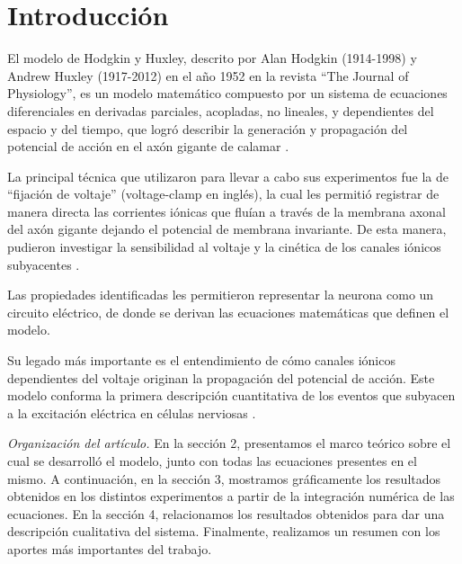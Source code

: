 \documentclass[aps,twocolumn,groupedaddress]{revtex4-2}
\begin{document}

\maketitle

\section{Introducción}
El modelo de Hodgkin y Huxley, descrito por Alan Hodgkin (1914-1998) y Andrew Huxley (1917-2012) en el año 1952 en la revista “The Journal of Physiology”, es un modelo matemático compuesto por un sistema de ecuaciones diferenciales en derivadas parciales, acopladas, no lineales, y dependientes del espacio y del tiempo, que logró describir la generación y propagación del potencial de acción en el axón gigante de calamar \cite{lamberti2007desarrollo}. 

La principal técnica que utilizaron para llevar a cabo sus experimentos fue la de “fijación de voltaje” (voltage-clamp en inglés), la cual les permitió registrar de manera directa las corrientes iónicas que fluían a través de la membrana axonal del axón gigante dejando el potencial de membrana invariante. De esta manera, pudieron investigar la sensibilidad al voltaje y la cinética de los canales iónicos subyacentes \cite{schwiening2012brief}.

Las propiedades identificadas les permitieron representar la neurona como un circuito eléctrico, de donde se derivan las ecuaciones matemáticas que definen el modelo.

Su legado más importante es el entendimiento de cómo canales iónicos dependientes del voltaje originan la propagación del potencial de acción. Este modelo conforma la primera descripción cuantitativa de los eventos que subyacen a la excitación eléctrica en células nerviosas \cite{schwiening2012brief}.

\textit{Organización del artículo.} En la sección 2, presentamos el marco teórico sobre el cual se desarrolló el modelo, junto con todas las ecuaciones presentes en el mismo. A continuación, en la sección 3, mostramos gráficamente los resultados obtenidos en los distintos experimentos a partir de la integración numérica de las ecuaciones. En la sección 4,  relacionamos los resultados obtenidos para dar una descripción cualitativa del sistema. Finalmente, realizamos un resumen con los aportes más importantes del trabajo.
\end{document}
